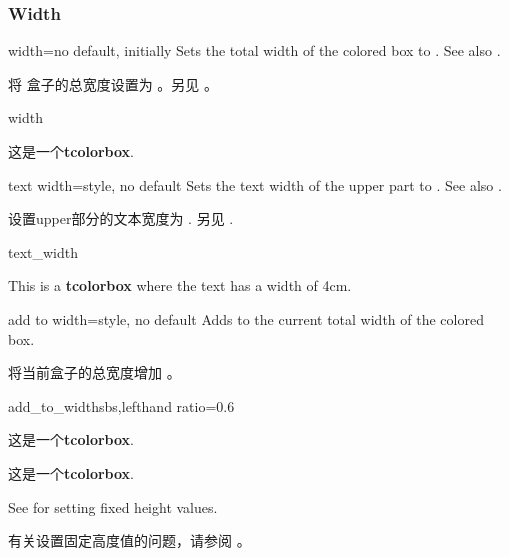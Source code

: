 \subsubsection{Width} 

\begin{docTcbKey}{width}{=}{no default, initially }
Sets the total width of the colored box to .
See also .

将%
盒子的总宽度设置为 。另见 。
\begin{exdispExample}{width} 

\begin{tcolorbox}[width=\linewidth/2]
这是一个\textbf{tcolorbox}.
\end{tcolorbox}
\end{exdispExample}
\end{docTcbKey}


\begin{docTcbKey}[][doc new=2014-10-31]{text width}{=}{style, no default}
Sets the text width of the upper part to .
See also .

设置upper部分的文本宽度为 .
另见 .
\begin{exdispExample}{text_width}

\begin{tcolorbox}[text width=4cm]
This is a \textbf{tcolorbox} where the text has a width of 4cm.
\end{tcolorbox}
\end{exdispExample}
\end{docTcbKey}

\begin{docTcbKey}[][doc new=2014-11-07]{add to width}{=}{style, no default}
Adds  to the current total width of the colored box.

将当前盒子的总宽度增加  。    
\begin{exdispExample*}{add_to_width}{sbs,lefthand ratio=0.6}

\begin{tcolorbox}
这是一个\textbf{tcolorbox}.
\end{tcolorbox}

\begin{tcolorbox}[add to width=1cm]
这是一个\textbf{tcolorbox}.
\end{tcolorbox}
\end{exdispExample*}
\end{docTcbKey}
See  for setting fixed height values.

有关设置固定高度值的问题，请参阅 。